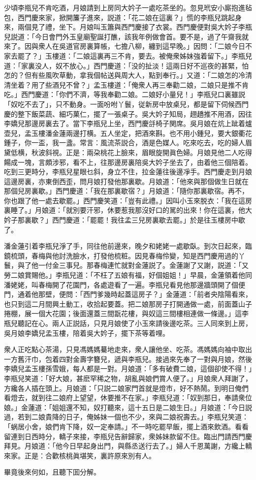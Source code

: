 少頃李瓶兒不肯吃酒，月娘請到上房同大妗子一處吃茶坐的。忽見玳安小廝抱進毡包，西門慶來家，掀開簾子進來，説道：「花二娘在這裏？」慌的李瓶兒跳起身來，兩個見了禮，坐下。月娘叫玉簫與西門慶接了衣裳。西門慶便對吳大妗子李瓶兒説道：「今日會門外玉皇廟聖誕打醮，該我年例做會首。要不是，過了午齋我就來了。因與衆人在吳道官房裏算帳，七擔八柳，纏到這早晚。」因問：「二娘今日不家去罷了？」玉樓道：「二娘這裏再三不肯，要去。被俺衆姊妹強着留下。」李瓶兒道：「家裏没人，奴不放心。」西門慶道：「没的扯淡！這兩日好不巡夜的甚緊，怕怎的？但有些風吹草動，拿我個帖送與周大人，點到奉行。」又道：「二娘怎的冷清清坐着？用了些酒兒不曾？」孟玉樓道：「俺衆人再三奉勸二娘，二娘只是推不肯吃。」西門慶道：「你們不濟，等我奉勸二娘。二娘好小量兒！」李瓶兒口裏雖説「奴吃不去了」，只不動身。一面吩咐丫鬟，従新房中放桌兒，都是留下伺候西門慶的整下飯菜蔬、細巧菓仁，擺了一張桌子。吳大妗子知局，趐趫推不用酒，因往李嬌兒那邊房裏去了。當下李瓶兒上坐，西門慶㧱椅子関席。吳月娘在炕上跐着爐壶兒，孟玉樓潘金蓮兩邊打横。五人坐定，把酒來斟。也不用小鍾兒，要大銀衢花鍾子，你一盃，我一盞。常言：風流茶説合，酒是色媒人。吃來吃去，吃的婦人眉黛低横，秋波斜視。正是：兩朶桃花上臉來，眉眼旋開眞色婦。月娘見他二人吃得餳成一塊，言頗涉邪，看不上，往那邊房裏陪吳大妗子坐去了，由着他三個陪着。吃到三更時分，李瓶兒星眼乜斜，身立不住，拉金蓮往後邊凈手。西門慶走到月娘這邊房裏，亦東倒西歪，問月娘打發他那裏歇。月娘道：「他來與那個做生日就在那個兒房裏歇。」西門慶道：「我在那裏歇宿？」月娘道：「隨你那裏歇宿。再不，你也跟了他一處去歇罷。」西門慶笑道：「豈有此禮。」因叫小玉來脱衣：「我在這房裏睡了。」月娘道：「就別要汗邪，休要惹我那沒好口的駡的出來！你在這裏，他大妗子那裏歇？」西門慶道：「罷罷！我往孟三兒房裏歇去罷。」於是往玉樓房中歇了。

潘金蓮引着李瓶兒淨了手，同往他前邊來，晚夕和姥姥一處歇臥。到次日起來，臨鏡梳頭，春梅與他討洗臉水，打發他梳粧。因見春梅伶變，知是西門慶用過的丫鬟，與了他一付金三事兒。那春梅連忙就對金蓮説了。金蓮謝了又謝，説道：「又勞二娘賞賜他。」李瓶兒道：「不枉了五娘有福，好個姐姐！」早晨，金蓮領着他同潘姥姥，叫春梅開了花園門，各處遊看了一遍。李瓶兒看見他那邊牆頭開了個便門，通着他那壁，便問：「西門爹幾時起蓋這房子？」金蓮道：「前者央陰陽看來，也只到這二月間興土動工，收拾起要蓋。把二娘那房子打開通做一處，前面蓋山子捲棚，展一個大花園；後面還蓋三間翫花樓，與奴這三間樓相連做一條邊。」這李瓶兒聽記在心。兩人正説話，只見月娘使了小玉來請後邊吃茶。三人同來到上房，吳月娘李嬌兒孟玉樓，陪着吳大妗子，擺下茶等着哩。

衆人正吃點心茶湯，只見馮媽媽驀地走來，衆人讓他坐、吃茶。馮媽媽向袖中取出一方舊汗巾，包着四對金壽字簪兒，遞與李瓶兒。接過來先奉了一對與月娘，然後李嬌兒孟玉樓孫雪娥，每人都是一對。月娘道：「多有破費二娘，這個卻使不得！」李瓶兒笑道：「好大娘，甚麽罕稀之物，胡亂與娘們賞人便了。」月娘衆人拜謝了，方纔各人插在頭上。月娘道：「只説二娘家門首就是燈市，好不熱鬧。到明日俺們看燈去，就到往二娘府上望望，休要推不在家。」李瓶兒道：「奴到那日，奉請衆位娘。」金蓮道：「姐姐還不知，奴打聽來，這十五日是二娘生日。」月娘道：「今日説過，若到二娘貴降的日子，俺姊妹一個也不少，來與二娘祝壽去。」李瓶兒笑道：「蜗居小舍，娘們肯下降，奴一定奉請。」不一時吃罷早飯，擺上酒來飲酒。看看留連到日西時分，轎子來接，李瓶兒告辭歸家，衆姊妹款留不住。臨出門請西門慶拜見。月娘道：「他今日早起身出門，與縣丞送行去了。」婦人千恩萬謝，方纔上轎來家。正是：合歡核桃眞堪笑，裏許原來別有人。

畢竟後來何如，且聽下囬分解。

